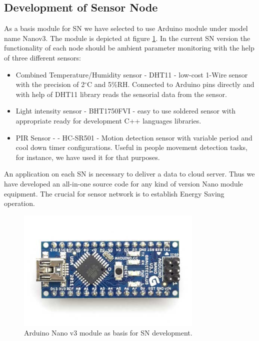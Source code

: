 \documentclass[journal]{IEEEtran}
\begin{document}
\subsection{Development of Sensor Node}
As a basis module for SN we have selected to use Arduino module under model name Nanov3. The module is depicted at figure \ref{ArduinoNano3}. In the current SN version the functionality of each node should be ambient parameter monitoring with the help of three different sensors:
\begin{itemize}
\item Combined Temperature/Humidity sensor - DHT11 \cite{DHT_11} - low-cost 1-Wire sensor with the precision of 2$^{\circ}$C and 5\%RH. Connected to Arduino pins directly and with help of DHT11 library reads the sensorial data from the sensor.
\item Light intensity sensor - BHT1750FVI \cite{BHT_1750} - easy to use soldered sensor with appropriate ready for development C++ languages libraries. 
\item PIR Sensor -\cite{PIR_s} - HC-SR501 - Motion detection sensor with variable period and cool down timer configurations. Useful in people movement detection tasks, for instance, we have used it for that purposes.
\end{itemize}
An application on each SN is necessary to deliver a data to cloud server. Thus we have developed an all-in-one source code for any kind of version Nano module equipment. The crucial for sensor network is to establish Energy Saving operation.
\begin{figure}[!t]
\centering
\includegraphics[width=3.5in]{ArduinoNano3}
\caption{Arduino Nano v3 module as basis for SN development.}
\label{ArduinoNano3}
\end{figure}
\end{document}
